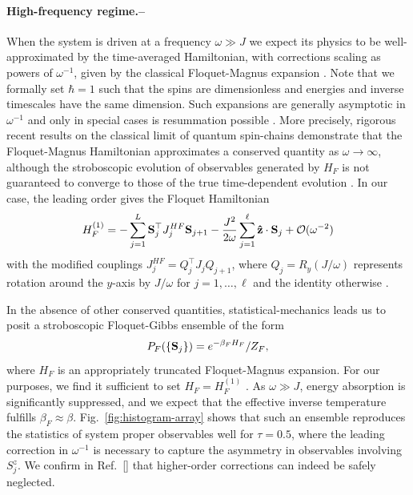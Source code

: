 \documentclass[prl,aps,twocolumn,notitlepage,10pt]{revtex4-1}
\newcommand{\be}{\begin{equation}}
\newcommand{\ee}{\end{equation}}
\begin{document}
\paragraph{High-frequency regime.--}\label{sec:high-frequency}
When the system is driven at a frequency $\omega \gg J$
we expect its physics to be well-approximated by the time-averaged Hamiltonian,
with corrections scaling as powers of $\omega^{-1}$, given by the classical
Floquet-Magnus expansion \cite{Oteo-Ros, Blanes-Casas-Oteo-Ros,
large-omega-comment, Bukov-DAlessio-Polkovnikov-review}.
Note that we formally set $\hbar=1$ such that the spins are dimensionless and
energies and inverse timescales have the same dimension.
Such expansions are generally asymptotic in $\omega^{-1}$ and only
in special cases is resummation possible \cite{feldman}.
More precisely, rigorous recent results  on the classical limit of quantum
spin-chains demonstrate that the Floquet-Magnus Hamiltonian approximates a
conserved quantity as $\omega\to\infty$, although the stroboscopic evolution of
observables generated by $H_{F}$ is not guaranteed to converge to those of the
true time-dependent evolution \cite{Mori-Kuwahara-Saito-prl-2016}.
In our case, the leading order gives the Floquet Hamiltonian
\be
H_{F}^{(1)} = - \sum_{j=1}^L {\bf S}_j^\top  J^{HF}_j {\bf S}_{j+1} 
- \frac{J^2}{2\omega}\sum_{j=1}^\ell {\bf \hat{z}} \cdot {\bf S}_j 
+ \mathcal{O}(\omega^{-2}) \label{eq:hf1}
\ee
with the modified couplings $J^{HF}_j = Q_j^\top J_j Q_{j+1}$, where $Q_j=
R_y(J/\omega)$ represents rotation around the $y$-axis by $J/\omega$ for
$j=1,\ldots,\ell$ and the identity otherwise
\cite{Bukov-DAlessio-Polkovnikov-review}.

In the absence of other conserved quantities, statistical-mechanics leads us to
posit a stroboscopic Floquet-Gibbs ensemble  of the form
\be
P_{F}(\{{\bf S}_j\}) = e^{-\beta_{F} H_{F}}/Z_{F},
\label{eq:floquet-gibbs}
\ee
where $H_{F}$ is an appropriately truncated Floquet-Magnus expansion.
For our purposes, we find it sufficient to set $H_{F} = H_{F}^{(1)}$
\cite{Floquet-gibbs-1,Floquet-gibbs-2}.
As $\omega \gg J$, energy absorption is significantly suppressed, and we expect
that the effective inverse temperature fulfills $\beta_{F} \approx \beta$.
Fig.~\ref{fig:histogram-array} shows that such an ensemble reproduces the
statistics of system proper observables well for $\tau=0.5$, where the leading
correction in $\omega^{-1}$ is necessary to capture the asymmetry in
observables involving $S^z_j$.
We confirm in Ref.~[] that higher-order corrections can
indeed be safely neglected.
\end{document}
